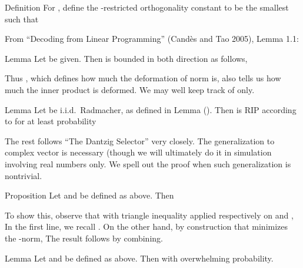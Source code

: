 \startsection [title={Design of RIP Precoders and Combiners}]

\Result
{Definition}
{
For , define the -restricted orthogonality constant  to be the smallest such that
%
}

From ``Decoding from Linear Programming'' (Cand\`es and Tao 2005), Lemma 1.1:

\Result
{Lemma}
{
Let  be given.
Then  is bounded in both direction as follows,
}

Thus , which defines how much the deformation of norm is, also tells us how much the inner product is deformed.
We may well keep track of  only.

\Result
{Lemma}
{
Let  be i.i.d.\ Radmacher, as defined in Lemma ().
Then  is RIP according to \m{\d} for at least probability
}


\color[red]{(To be done)}

\startsection [title={DS for Complex Vectors}]

The rest follows ``The Dantzig Selector'' very closely.
The generalization to complex vector is necessary (though we will ultimately do it in simulation involving real numbers only.
We spell out the proof when such generalization is nontrivial.

\Result
{Proposition}
{
Let  and  be defined as above.
Then
%
}

To show this, observe that with triangle inequality applied respectively on  and ,
In the first line, we recall .
On the other hand, by construction that  minimizes the -norm,
The result follows by combining.

\Result
{Lemma}
{
Let  and  be defined as above.
Then
%
%
with overwhelming probability.
}

